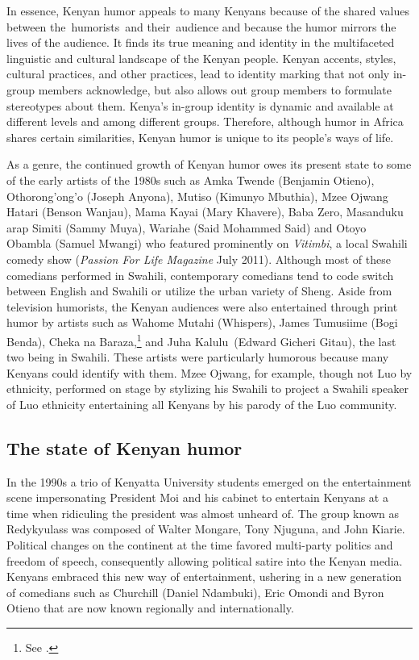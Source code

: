 \documentclass[output=paper]{langsci/langscibook}
\begin{document}
In essence, Kenyan humor appeals to many Kenyans because of the shared values between the~humorists~and their~audience and because the humor mirrors the lives of the audience. It finds its true meaning and identity in the multifaceted linguistic and cultural landscape of the Kenyan people. Kenyan accents, styles, cultural practices, and other practices, lead to identity marking that not only in-group members acknowledge, but also allows out group members to formulate stereotypes about them. Kenya’s in-group identity is dynamic and available at different levels and among different groups. Therefore, although humor in Africa shares certain similarities, Kenyan humor is unique to its people’s ways of life.

As a genre, the continued growth of Kenyan humor owes its present state to some of the early artists of the 1980s such as Amka Twende (Benjamin Otieno), Othorong’ong’o (Joseph Anyona), Mutiso (Kimunyo Mbuthia), Mzee Ojwang Hatari (Benson Wanjau), Mama Kayai (Mary Khavere), Baba Zero, Masanduku arap Simiti (Sammy Muya), Wariahe (Said Mohammed Said) and Otoyo Obambla (Samuel Mwangi) who featured prominently on \textit{Vitimbi}, a local Swahili comedy show (\textit{Passion For Life Magazine} July 2011). Although most of these comedians performed in Swahili, contemporary comedians tend to code switch between English and Swahili or utilize the urban variety of Sheng. Aside from television humorists, the Kenyan audiences were also entertained through print humor by artists such as Wahome Mutahi (Whispers), James Tumusiime (Bogi Benda), Cheka na Baraza,\footnote{ See \citet{Rhoades1977}.} and Juha Kalulu~(Edward Gicheri Gitau), the last two being in Swahili. These artists were particularly humorous because many Kenyans could identify with them. Mzee Ojwang, for example, though not Luo by ethnicity, performed on stage by stylizing his Swahili to project a Swahili speaker of Luo ethnicity entertaining all Kenyans by his parody of the Luo community.

\subsection{The state of Kenyan humor}\label{sec:muaka:1.3}

In the 1990s a trio of Kenyatta University students emerged on the entertainment scene impersonating President Moi and his cabinet to entertain Kenyans at a time when ridiculing the president was almost unheard of. The group known as Redykyulass was composed of Walter Mongare, Tony Njuguna, and John Kiarie. Political changes on the continent at the time favored multi-party politics and freedom of speech, consequently allowing political satire into the Kenyan media. Kenyans embraced this new way of entertainment, ushering in a new generation of comedians such as Churchill (Daniel Ndambuki), Eric Omondi and Byron Otieno that are now known regionally and internationally. 
\end{document}

